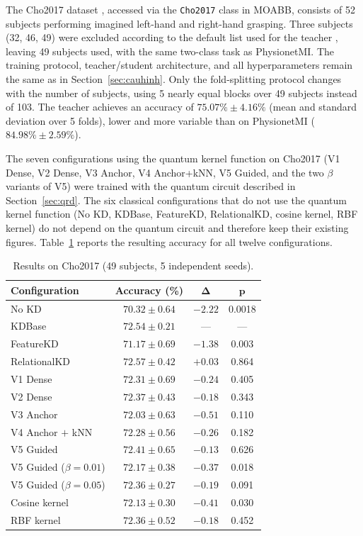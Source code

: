 The Cho2017 dataset \cite{cho2017eeg}, accessed via the
\texttt{Cho2017} class in MOABB, consists of 52 subjects performing
imagined left-hand and right-hand grasping. Three subjects (32, 46,
49) were excluded according to the default list used for the teacher
\cite{zoumpourlis2024motor}, leaving 49 subjects used, with the same
two-class task as PhysionetMI. The training protocol, teacher/student
architecture, and all hyperparameters remain the same as in
Section~\ref{sec:cauhinh}. Only the fold-splitting protocol changes
with the number of subjects, using 5 nearly equal blocks over 49
subjects instead of 103. The teacher achieves an accuracy of
$75.07\% \pm 4.16\%$ (mean and standard deviation over 5 folds),
lower and more variable than on PhysionetMI ($84.98\% \pm 2.59\%$).

The seven configurations using the quantum kernel function on
Cho2017 (V1 Dense, V2 Dense, V3 Anchor, V4 Anchor+kNN, V5 Guided, and
the two $\beta$ variants of V5) were trained with the quantum
circuit described in Section~\ref{sec:qrd}. The six classical
configurations that do not use the quantum kernel function (No KD,
KDBase, FeatureKD, RelationalKD, cosine kernel, RBF kernel) do not
depend on the quantum circuit and therefore keep their existing
figures. Table~\ref{tab:cho2017} reports the resulting accuracy for
all twelve configurations.

\begin{table}[!htbp]
\centering
\caption{Results on Cho2017 (49 subjects, 5 independent seeds).}
\label{tab:cho2017}
\begin{tabular}{lccc}
\toprule
\textbf{Configuration} & \textbf{Accuracy (\%)} & $\boldsymbol{\Delta}$ & $\boldsymbol{p}$ \\
\midrule
No KD & $70.32 \pm 0.64$ & $-2.22$ & 0.0018 \\
KDBase & $72.54 \pm 0.21$ & --- & --- \\
FeatureKD & $71.17 \pm 0.69$ & $-1.38$ & 0.003 \\
RelationalKD & $72.57 \pm 0.42$ & $+0.03$ & 0.864 \\
\midrule
V1 Dense & $72.31 \pm 0.69$ & $-0.24$ & 0.405 \\
V2 Dense & $72.37 \pm 0.43$ & $-0.18$ & 0.343 \\
V3 Anchor & $72.03 \pm 0.63$ & $-0.51$ & 0.110 \\
V4 Anchor $+$ kNN & $72.28 \pm 0.56$ & $-0.26$ & 0.182 \\
V5 Guided & $72.41 \pm 0.65$ & $-0.13$ & 0.626 \\
V5 Guided ($\beta = 0.01$) & $72.17 \pm 0.38$ & $-0.37$ & 0.018 \\
V5 Guided ($\beta = 0.05$) & $72.36 \pm 0.27$ & $-0.19$ & 0.091 \\
\midrule
Cosine kernel & $72.13 \pm 0.30$ & $-0.41$ & 0.030 \\
RBF kernel & $72.36 \pm 0.52$ & $-0.18$ & 0.452 \\
\bottomrule
\end{tabular}
\end{table}
\FloatBarrier

